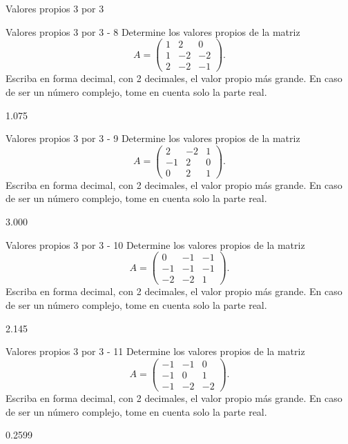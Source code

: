 \documentclass[a4,11pt]{aleph-notas}
\begin{document}
\begin{quiz}{Valores propios 3 por 3}
\begin{numerical}[tolerance=0.01]%
    {Valores propios 3 por 3 - 8}
    Determine los valores propios de la matriz
    \[
    A = \begin{pmatrix}
    1 & 2 & 0 \\
    1 & -2 & -2 \\
    2 & -2 & -1
    \end{pmatrix}.
    \]
    Escriba en forma decimal, con 2 decimales, el valor propio más grande. En caso de ser un número complejo, tome en cuenta solo la parte real.
    \item[] 1.075
\end{numerical}

\begin{numerical}[tolerance=0.01]%
    {Valores propios 3 por 3 - 9}
    Determine los valores propios de la matriz
    \[
    A = \begin{pmatrix}
    2 & -2 & 1 \\
    -1 & 2 & 0 \\
    0 & 2 & 1
    \end{pmatrix}.
    \]
    Escriba en forma decimal, con 2 decimales, el valor propio más grande. En caso de ser un número complejo, tome en cuenta solo la parte real.
    \item[] 3.000
\end{numerical}

\begin{numerical}[tolerance=0.01]%
    {Valores propios 3 por 3 - 10}
    Determine los valores propios de la matriz
    \[
    A = \begin{pmatrix}
    0 & -1 & -1 \\
    -1 & -1 & -1 \\
    -2 & -2 & 1
    \end{pmatrix}.
    \]
    Escriba en forma decimal, con 2 decimales, el valor propio más grande. En caso de ser un número complejo, tome en cuenta solo la parte real.
    \item[] 2.145
\end{numerical}

\begin{numerical}[tolerance=0.01]%
    {Valores propios 3 por 3 - 11}
    Determine los valores propios de la matriz
    \[
    A = \begin{pmatrix}
    -1 & -1 & 0 \\
    -1 & 0 & 1 \\
    -1 & -2 & -2
    \end{pmatrix}.
    \]
    Escriba en forma decimal, con 2 decimales, el valor propio más grande. En caso de ser un número complejo, tome en cuenta solo la parte real.
    \item[] 0.2599
\end{numerical}


\end{quiz}
\end{document}
